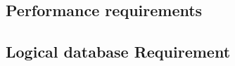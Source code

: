 \subsection{Performance requirements}
\subsection{Logical database Requirement}

\subsection{}
\subsection{}
\subsection{}

